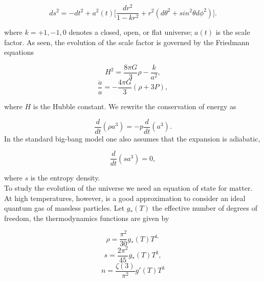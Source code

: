 \documentclass[11pt,a4paper,twoside]{book}
\begin{document}
\begin{equation}
	\label{metricCh2}	
	ds^{2}   = - dt^{2} + a^{2}(t)\Big[\frac{dr^{2}}{1-kr^{2}}  +  r^{2}(d\theta^{2} + sin^{2} \theta d\phi^{2})\Big] . 
\end{equation}

where $ k=+1,-1,0 $ denotes a closed, open, or flat universe; $ a(t) $ is the scale factor.
As seen, the evolution of the scale factor is governed by the Friedmann equations

\begin{equation}
	\label{friedmannEquations1Chap2}
	H^{2}=\frac{8\pi G}{3}\rho - \frac{k}{a^{2}},
\end{equation}
\begin{equation}
	\label{friedmannEquations2Chap2}	
	\frac{\ddot{a}}{a} = -\frac{4\pi G}{3}(\rho + 3P),
\end{equation}

where $ H  $ is the Hubble constant. We rewrite the conservation of energy as

\begin{equation}
\label{Chap2:ConservationEnergy}
\frac{d}{dt}(\rho a^{3})=-p\frac{d}{dt}(a^{3}).
\end{equation}
In the standard big-bang model one also assumes that the expansion is adiabatic,

\begin{equation}
\label{Chap2:entropy1}
\frac{d}{dt}(sa^{3})=0,
\end{equation}

where $ s $ is the entropy density.\\
To study the evolution of the universe we need an equation of state for matter. At high temperatures, however, is a good approximation to consider an ideal quantum gas of massless particles. Let $ g_{*}(T) $ the effective number of degrees of freedom, the thermodynamics functions are given by

\begin{equation}
\label{Chap2EnergyDensity}
\rho=\frac{\pi^{2}}{30}	g_{*}(T)T^{4,}	
\end{equation}
\begin{equation}
\label{s}
s=\frac{2\pi^{2}}{45}g_{*}(T)T^{3},
\end{equation}
\begin{equation}
	\label{n}
	n=\frac{\zeta(3)}{\pi^{2}}g'(T)T^{3}
\end{equation}
\end{document}
